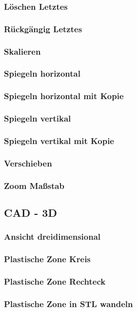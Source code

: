 \documentclass[a4paper]{book}
\begin{document}
			\subsubsection{Löschen Letztes}
			\subsubsection{Rückgängig Letztes}
			\subsubsection{Skalieren}
			\subsubsection{Spiegeln horizontal}
			\subsubsection{Spiegeln horizontal mit Kopie}
			\subsubsection{Spiegeln vertikal}
			\subsubsection{Spiegeln vertikal mit Kopie}
			\subsubsection{Verschieben}
			\subsubsection{Zoom Maßstab}
		\subsection{CAD - 3D}
			\subsubsection{Ansicht dreidimensional}
			\subsubsection{Plastische Zone Kreis}
			\subsubsection{Plastische Zone Rechteck}
			\subsubsection{Plastische Zone in STL wandeln}
\end{document}
